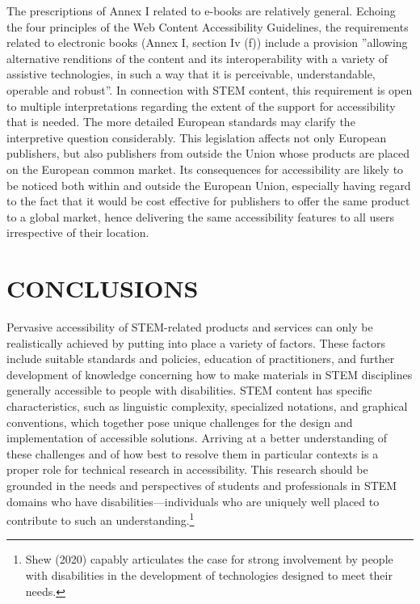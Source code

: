 \documentclass{sig-alternate} %
\begin{document}
\begin{large}
The prescriptions of Annex I related to e-books are relatively general. Echoing the four principles of the Web Content Accessibility Guidelines, the requirements related to electronic books (Annex I, section Iv (f)) include a provision ”allowing alternative renditions of the content and its interoperability with a variety of assistive technologies, in such a way that it is perceivable, understandable, operable and robust”. In connection with STEM content, this requirement is open to multiple interpretations regarding the extent of the support for accessibility that is needed. The more detailed European standards may clarify the interpretive question considerably. This legislation affects not only European publishers, but also publishers from outside the Union whose products are placed on the European common market. Its consequences for accessibility are likely to be noticed both within and outside the European Union, especially having regard to the fact that it would be cost effective for publishers to offer the same product to a global market, hence delivering the same accessibility features to all users irrespective of their location.

\section*{CONCLUSIONS}

Pervasive accessibility of STEM-related products and services can only be realistically achieved by putting into place a variety of factors. These factors include suitable standards and policies, education of practitioners, and further development of knowledge concerning how to make materials in STEM disciplines generally accessible to people with disabilities. STEM content has specific characteristics, such as linguistic complexity, specialized notations, and graphical conventions, which together pose unique challenges for the design and implementation of accessible solutions. Arriving at a better understanding of these challenges and of how best to resolve them in particular contexts is a proper role for technical research in accessibility. This research should be grounded in the needs and perspectives of students and professionals in STEM domains who have disabilities—individuals who are uniquely well placed to contribute to such an understanding.\footnote{Shew (2020) capably articulates the case for strong involvement by people with disabilities in the development of technologies designed to meet their needs.}


\end{large}
\end{document}
